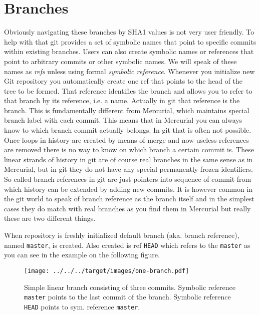 \documentclass{article}
\theoremstyle{definition}
\begin{document}
        \section{Branches}

        Obviously navigating these branches by SHA1 values is not very user friendly. To help with that git provides a set
        of symbolic names that point to specific commits within existing branches. Users can also create symbolic names or
        references that point to arbitrary commits or other symbolic names. We will speak of these names as {\em refs}
        unless using formal {\em symbolic reference}. Whenever you initialize new Git repository you automatically create
        one ref that points to the head of the tree to be formed. That reference identifies the branch and allows you to refer
        to that branch by its reference, i.e. a name. Actually in git that reference is the branch. This is fundamentally
        different from Mercurial, which maintains special branch label with each commit. This means that in Mercurial you
        can always know to which branch commit actually belongs. In git that is often not possible. Once loops in history
        are created by means of merge and now useless references are removed there is no way to know on which branch a
        certain commit is. These linear strands of history in git are of course real branches in the same sense as in
        Mercurial, but in git they do not have any special permanently frozen identifiers. So called branch references in
        git are just pointers into sequence of commit from which history can be extended by adding new commits. It is
        however common in the git world to speak of branch reference as the branch itself and in the simplest cases they do
        match with real branches as you find them in Mercurial but really these are two different things.

        When repository is freshly initialized default branch (aka. branch reference), named \texttt{master}, is created. 
        Also created is ref \texttt{HEAD} which refers to the \texttt{master} as you can see in the
        example on the following figure.

        \begin{figure}[h]
            \centering\texttt{[image: ../../../target/images/one-branch.pdf]}
            \caption{Simple linear branch consisting of three commits. Symbolic reference \texttt{master} points to the last
              commit of the branch. Symbolic reference \texttt{HEAD} points to sym. reference \texttt{master}.\label{fig:one-branch}}
        \end{figure}
\end{document}
